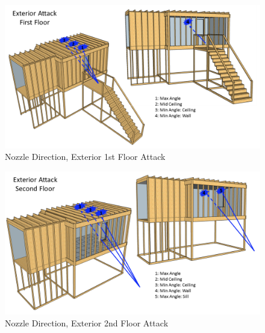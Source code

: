 \documentclass{article}
\begin{document}
\begin{figure}[!ht]
	\centering
	\includegraphics[width=\columnwidth]{Figures/Water_Distribution/Nozzle_Position_ExtFirstfloor}
	\caption{Nozzle Direction, Exterior 1st Floor Attack}
	\label{fig:Nozzle_Direction_Exterior_1st_Floor_Attack}
\end{figure}

\begin{figure}[!ht]
	\centering
	\includegraphics[width=\columnwidth]{Figures/Water_Distribution/Nozzle_Position_ExtSecondfloor}
	\caption{Nozzle Direction, Exterior 2nd Floor Attack}
	\label{fig:Nozzle_Direction_Exterior_2nd_Floor_Attack}
\end{figure}

\clearpage
\end{document}
